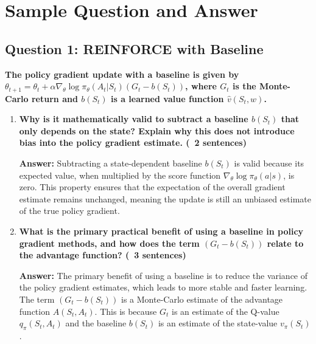 \documentclass[12pt]{article}
\begin{document}
\section{Sample Question and Answer}

\subsection*{Question 1: REINFORCE with Baseline}
\textbf{The policy gradient update with a baseline is given by $\theta_{t+1} = \theta_t + \alpha \nabla_\theta \log \pi_\theta(A_t|S_t) (G_t - b(S_t))$, where $G_t$ is the Monte-Carlo return and $b(S_t)$ is a learned value function $\hat{v}(S_t, w)$.}
\begin{enumerate}
    \item \textbf{Why is it mathematically valid to subtract a baseline $b(S_t)$ that only depends on the state? Explain why this does not introduce bias into the policy gradient estimate. (~2 sentences)}

    \textbf{Answer:} Subtracting a state-dependent baseline $b(S_t)$ is valid because its expected value, when multiplied by the score function $\nabla_\theta \log \pi_\theta(a|s)$, is zero. This property ensures that the expectation of the overall gradient estimate remains unchanged, meaning the update is still an unbiased estimate of the true policy gradient.
    \item \textbf{What is the primary practical benefit of using a baseline in policy gradient methods, and how does the term $(G_t - b(S_t))$ relate to the advantage function? (~3 sentences)}

    \textbf{Answer:} The primary benefit of using a baseline is to reduce the variance of the policy gradient estimates, which leads to more stable and faster learning. The term $(G_t - b(S_t))$ is a Monte-Carlo estimate of the advantage function $A(S_t, A_t)$. This is because $G_t$ is an estimate of the Q-value $q_\pi(S_t, A_t)$ and the baseline $b(S_t)$ is an estimate of the state-value $v_\pi(S_t)$.
\end{enumerate}
\end{document}
